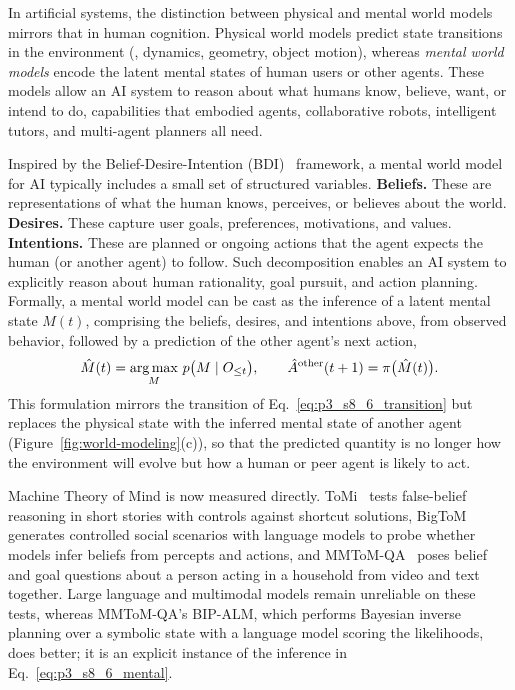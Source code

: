 In artificial systems, the distinction between physical and mental world models mirrors that in human
cognition.
Physical world models predict state transitions in the environment (\eg, dynamics, geometry, object motion), whereas \emph{mental world models} encode the latent mental states of human users or other agents.
These models allow an AI system to reason about what humans know, believe, want, or intend to do, capabilities that embodied agents, collaborative robots, intelligent tutors, and multi-agent planners all need.



Inspired by the Belief-Desire-Intention (BDI)~\cite{rao1995bdi,georgeff1998belief} framework, a mental world model for AI typically includes a small set of structured variables.
\textbf{Beliefs.} These are representations of what the human knows, perceives, or believes about the world.
\textbf{Desires.} These capture user goals, preferences, motivations, and values.
\textbf{Intentions.} These are planned or ongoing actions that the agent expects the human (or another agent) to follow.
Such decomposition enables an AI system to explicitly reason about human rationality, goal pursuit, and action planning.
Formally, a mental world model can be cast as the inference of a latent mental state $M(t)$, comprising the beliefs, desires, and intentions above, from observed behavior, followed by a prediction of the other agent's next action,
\begin{equation}
\label{eq:p3_s8_6_mental}
\hat{M}(t) = \operatorname*{arg\,max}_{M}\, p\big(M \mid O_{\le t}\big), \qquad \hat{A}^{\text{other}}(t+1) = \pi\big(\hat{M}(t)\big).
\end{equation}
This formulation mirrors the transition of Eq.~\eqref{eq:p3_s8_6_transition} but replaces the physical state with the inferred mental state of another agent (Figure~\ref{fig:world-modeling}(c)), so that the predicted quantity is no longer how the environment will evolve but how a human or peer agent is likely to act.

Machine Theory of Mind is now measured directly. ToMi~\cite{le2019tomi} tests false-belief reasoning in short stories with controls against shortcut solutions, BigToM~\cite{gandhi2023bigtom} generates controlled social scenarios with language models to probe whether models infer beliefs from percepts and actions, and MMToM-QA~\cite{jin2024mmtomqa} poses belief and goal questions about a person acting in a household from video and text together. Large language and multimodal models remain unreliable on these tests, whereas MMToM-QA's BIP-ALM, which performs Bayesian inverse planning over a symbolic state with a language model scoring the likelihoods, does better; it is an explicit instance of the inference in Eq.~\eqref{eq:p3_s8_6_mental}.

